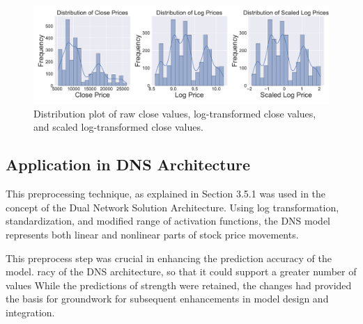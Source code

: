 \begin{figure}[h]
    \centering
    \includegraphics[width=\textwidth]{Images/distribution_plot.pdf}
    \caption{Distribution plot of raw close values, log-transformed close values, and scaled log-transformed close values.}
    \label{fig:distribution_plot}
\end{figure}

\subsection{Application in DNS Architecture}
This preprocessing technique, as explained in Section 3.5.1 was used in the concept of the Dual Network Solution Architecture. Using log transformation, standardization, and modified range of activation functions,
the DNS model represents both linear and nonlinear parts of
stock price movements.

This preprocess step was crucial in enhancing the prediction accuracy of the model.
racy of the DNS architecture, so that it could support a greater number of values
While the predictions of strength were retained, the changes had provided the basis for
groundwork for subsequent enhancements in model design and integration.




